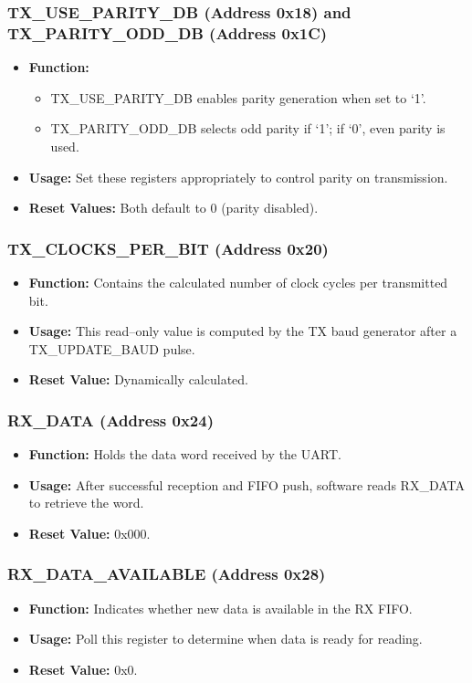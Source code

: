 \subsubsection{TX\_USE\_PARITY\_DB (Address 0x18) and TX\_PARITY\_ODD\_DB (Address 0x1C)}
\begin{itemize}[noitemsep]
    \item \textbf{Function:} 
    \begin{itemize}
        \item TX\_USE\_PARITY\_DB enables parity generation when set to ‘1’.
        \item TX\_PARITY\_ODD\_DB selects odd parity if ‘1’; if ‘0’, even parity is used.
    \end{itemize}
    \item \textbf{Usage:} Set these registers appropriately to control parity on transmission.
    \item \textbf{Reset Values:} Both default to 0 (parity disabled).
\end{itemize}

\subsubsection{TX\_CLOCKS\_PER\_BIT (Address 0x20)}
\begin{itemize}[noitemsep]
    \item \textbf{Function:} Contains the calculated number of clock cycles per transmitted bit.
    \item \textbf{Usage:} This read–only value is computed by the TX baud generator after a TX\_UPDATE\_BAUD pulse.
    \item \textbf{Reset Value:} Dynamically calculated.
\end{itemize}

\subsubsection{RX\_DATA (Address 0x24)}
\begin{itemize}[noitemsep]
    \item \textbf{Function:} Holds the data word received by the UART.
    \item \textbf{Usage:} After successful reception and FIFO push, software reads RX\_DATA to retrieve the word.
    \item \textbf{Reset Value:} 0x000.
\end{itemize}

\subsubsection{RX\_DATA\_AVAILABLE (Address 0x28)}
\begin{itemize}[noitemsep]
    \item \textbf{Function:} Indicates whether new data is available in the RX FIFO.
    \item \textbf{Usage:} Poll this register to determine when data is ready for reading.
    \item \textbf{Reset Value:} 0x0.
\end{itemize}

